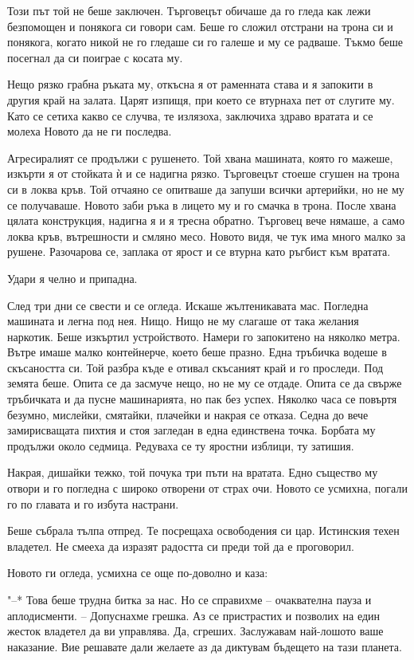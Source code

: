 \documentclass[ebook,openany,12pt]{memoir}
\begin{document}
Този път той не беше заключен. Търговецът обичаше да го гледа как лежи безпомощен и понякога си говори сам. Беше го сложил отстрани на трона си и понякога, когато никой не го гледаше си го галеше и му се радваше. Тъкмо беше посегнал да си поиграе с косата му.

Нещо рязко грабна ръката му, откъсна я от раменната става и я запокити в другия край на залата. Царят изпищя, при което се втурнаха пет от слугите му. Като се сетиха какво се случва, те излязоха, заключиха здраво вратата и се молеха Новото да не ги последва.

Агресиралият се продължи с рушенето. Той хвана машината, която го мажеше, изкърти я от стойката ѝ и се надигна рязко. Търговецът стоеше сгушен на трона си в локва кръв. Той отчаяно се опитваше да запуши всички артерийки, но не му се получаваше. Новото заби ръка в лицето му и го смачка в трона. После хвана цялата конструкция, надигна я и я тресна обратно. Търговец вече нямаше, а само локва кръв, вътрешности и смляно месо. Новото видя, че тук има много малко за рушене. Разочарова се, заплака от ярост и се втурна като ръгбист към вратата.

Удари я челно и припадна.

След три дни се свести и се огледа. Искаше жълтеникавата мас. Погледна машината и легна под нея. Нищо. Нищо не му слагаше от така желания наркотик. Беше изкъртил устройството. Намери го запокитено на няколко метра. Вътре имаше малко контейнерче, което беше празно. Една тръбичка водеше в скъсаността си. Той разбра къде е отивал скъсаният край и го проследи. Под земята беше. Опита се да засмуче нещо, но не му се отдаде. Опита се да свърже тръбичката и да пусне машинарията, но пак без успех. Няколко часа се повъртя безумно, мислейки, смятайки, плачейки и накрая се отказа. Седна до вече замирисващата пихтия и стоя загледан в една единствена точка. Борбата му продължи около седмица. Редуваха се ту яростни изблици, ту затишия.

Накрая, дишайки тежко, той почука три пъти на вратата. Едно същество му отвори и го погледна с широко отворени от страх очи. Новото се усмихна, погали го по главата и го избута настрани.

Беше събрала тълпа отпред. Те посрещаха освободения си цар. Истинския техен владетел. Не смееха да изразят радостта си преди той да е проговорил.

Новото ги огледа, усмихна се още по-доволно и каза:

"--* Това беше трудна битка за нас. Но се справихме – очаквателна пауза и аплодисменти. – Допуснахме грешка. Аз се пристрастих и позволих на един жесток владетел да ви управлява. Да, сгреших. Заслужавам най-лошото ваше наказание. Вие решавате дали желаете аз да диктувам бъдещето на тази планета.
\end{document}
